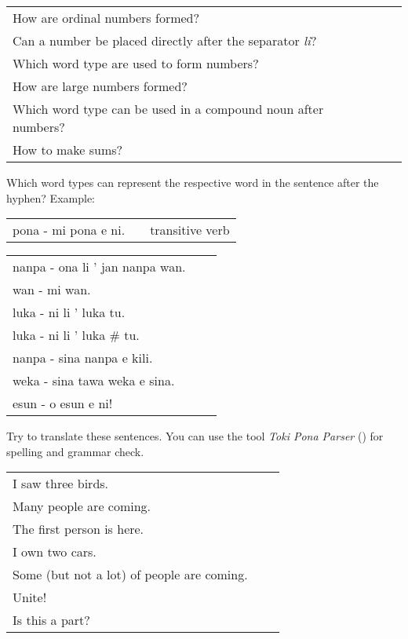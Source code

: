 \begin{supertabular}{p{5,5cm}|ll}
How are ordinal numbers formed? &&   \\ %
Can a number be placed directly after the separator \textit{li}? &&  \\ %
Which word type are used to form numbers? &&  \\ %
How are large numbers formed? &&  \\ %
Which word type can be used in a compound noun after numbers? && \\ %
How to make sums? &&  \\ %
\end{supertabular} 

Which word types can represent the respective word in the sentence after the hyphen?
Example:

\begin{supertabular}{p{5,5cm}|ll}
pona - mi pona e ni. && transitive verb \\ %
\end{supertabular}

\begin{supertabular}{p{5,5cm}|ll}
nanpa - ona li ' jan nanpa wan. &&  \\ %
wan - mi wan. &&  \\ %
luka - ni li ' luka tu. && \\ %
luka - ni li ' luka # tu. &&  \\ %
nanpa - sina nanpa e kili. &&  \\ %
weka - sina tawa weka e sina. &&  \\ %
esun - o esun e ni! &&  \\ %
\end{supertabular}

Try to translate these sentences. 
You can use the tool \textit{Toki Pona Parser} (\cite{www:rowa:02}) for spelling and grammar check. 

\begin{supertabular}{p{5,5cm}|ll}
I saw three birds.  &&   \\ %
Many people are coming. &&  \\   %
The first person is here. && \\   %
I own two cars.  &&  \\ %
Some (but not a lot) of people are coming. && \\  %
Unite!  &&   \\ %
Is this a part? &&  \\ %
\end{supertabular}

